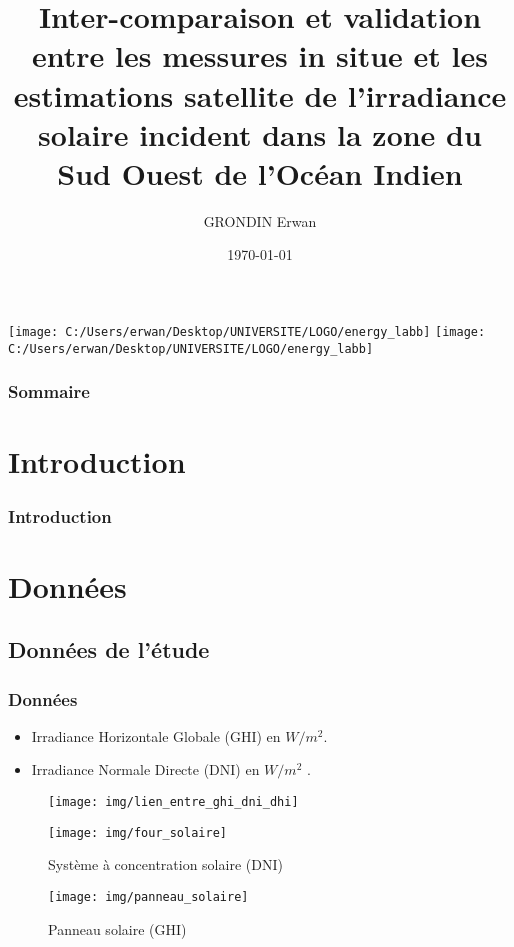 \documentclass{beamer}
\title{Inter-comparaison et validation entre les messures in situe et les estimations satellite de l'irradiance solaire incident dans la zone du Sud Ouest de l'Océan Indien}
\author{GRONDIN Erwan}
\institute{Universié de La Réunion}
\date{\today}
\begin{document}
	

	
\begin{frame}
\titlepage

\centering
\texttt{[image: C:/Users/erwan/Desktop/UNIVERSITE/LOGO/energy\_labb]}
\texttt{[image: C:/Users/erwan/Desktop/UNIVERSITE/LOGO/energy\_labb]}

\thispagestyle{empty} %
\end{frame}

\begin{frame}
	\frametitle{Sommaire}
	\tableofcontents[]
	\thispagestyle{empty}
\end{frame}

\section{Introduction}
\begin{frame}
	\frametitle{Introduction}
	
\end{frame}

\section{Données}
\subsection{Données de l'étude}
\begin{frame}
	\frametitle{Données}
	\begin{minipage}[t]{0.48\textwidth}
		\begin{itemize}
			\item Irradiance Horizontale Globale (GHI) en $W/m^2$.
			\item Irradiance Normale Directe (DNI) en $W/m^2$ .
		\end{itemize}
	\end{minipage}
	\hfill
	\begin{minipage}[t]{0.48\textwidth}
		\begin{figure}
			\centering
			\texttt{[image: img/lien\_entre\_ghi\_dni\_dhi]}
		\end{figure}
	\end{minipage}
	\vfill
	\begin{minipage}[t]{0.48\textwidth}
		\begin{figure}
			\centering
			\texttt{[image: img/four\_solaire]}
			\caption{Système à concentration solaire (DNI)}
			\label{fig:foursolaire}
		\end{figure}
		
	\end{minipage}
	\hfill
	\begin{minipage}[t]{0.48\textwidth}
		\begin{figure}
			\centering
			\texttt{[image: img/panneau\_solaire]}
			\caption{Panneau solaire (GHI)}
			\label{fig:Panneausolaire}
		\end{figure}
	\end{minipage}
\end{frame}
\end{document}

